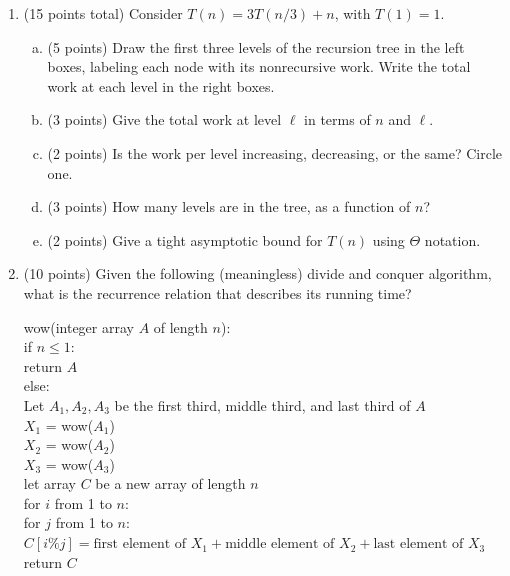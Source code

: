 \documentclass[11pt]{article}
\newcommand{\sectiontitle}[1]{\begin{center}\LARGE\textbf{#1}\end{center}}
\begin{document}
\begin{enumerate}
\vfill
\newpage
\sectiontitle{Section 3 (Recursion)}
\item (15 points total) Consider $T(n)=3T(n/3)+n$, with $T(1)=1$.
\begin{enumerate}[(a)]
\item (5 points) Draw the first three levels of the recursion tree in the left boxes, labeling each node with its nonrecursive work. Write the total work at each level in the right boxes.
\begin{center}
\end{center}
\item (3 points) Give the total work at level $\ell$ in terms of $n$ and $\ell$.
\vspace{.55in}
\item (2 points) Is the work per level increasing, decreasing, or the same? Circle one.
\vspace{.25in}
\item (3 points) How many levels are in the tree, as a function of $n$?
\vspace{.55in}
\item (2 points) Give a tight asymptotic bound for $T(n)$ using $\Theta$ notation.
\vspace{.55in}
\end{enumerate}
\newpage
\item (10 points) Given the following (meaningless) divide and conquer algorithm,
what is the recurrence relation that describes its running time?

    \begin{algo}
    wow(integer array $A$ of length $n$): \+ \\
    if $n \leq 1$:\+\\
        return $A$\-\\
    else:\+\\
    Let $A_1, A_2, A_3$ be the first third, middle third, and last third of $A$\\
    $X_1$ = wow($A_1$)\\
    $X_2$ = wow($A_2$)\\
    $X_3$ = wow($A_3$)\\
    let array $C$ be a new array of length $n$\\
    for $i$ from 1 to $n$:\+\\
        for $j$ from 1 to $n$:\+\\
            $C[i \% j] = \textrm{first element of } X_1 + \textrm{middle element of
            }X_2 +\textrm{last element of } X_3$\-\-\\
    return $C$\-\\
    \end{algo}


\end{enumerate}
\end{document}
